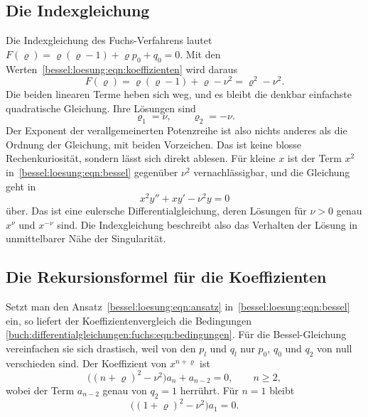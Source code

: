 %
%
\subsection{Die Indexgleichung
\label{bessel:loesung:subsection:index}}
Die Indexgleichung des Fuchs-Verfahrens lautet $F(\varrho) = \varrho(\varrho-1) + \varrho p_0 + q_0 = 0$.
%
Mit den Werten~\eqref{bessel:loesung:eqn:koeffizienten} wird daraus
\begin{equation}
F(\varrho)
=
\varrho(\varrho-1) + \varrho - \nu^2
=
\varrho^2 - \nu^2.
\label{bessel:loesung:eqn:index}
\end{equation}
Die beiden linearen Terme heben sich weg, und es bleibt die denkbar einfachste quadratische Gleichung.
Ihre Lösungen sind
\begin{equation}
\varrho_1 = \nu,
\qquad
\varrho_2 = -\nu.
\label{bessel:loesung:eqn:varrho}
\end{equation}
Der Exponent der verallgemeinerten Potenzreihe ist also nichts anderes als die Ordnung der Gleichung, mit beiden Vorzeichen.
Das ist keine blosse Rechenkuriosität, sondern lässt sich direkt ablesen.
Für kleine $x$ ist der Term $x^2$ in~\eqref{bessel:loesung:eqn:bessel}
gegenüber $\nu^2$ vernachlässigbar, und die Gleichung geht in
\[
x^2y'' + xy' - \nu^2 y = 0
\]
über.
Das ist eine eulersche Differentialgleichung, deren Lösungen für $\nu>0$ genau $x^{\nu}$ und $x^{-\nu}$ sind.
Die Indexgleichung beschreibt also das Verhalten der Lösung in unmittelbarer Nähe der Singularität.

%
%
\subsection{Die Rekursionsformel für die Koeffizienten
\label{bessel:loesung:subsection:rekursion}}
Setzt man den Ansatz~\eqref{bessel:loesung:eqn:ansatz} in~\eqref{bessel:loesung:eqn:bessel} ein, so liefert der Koeffizientenvergleich die Bedingungen \eqref{buch:differentialgleichungen:fuchs:eqn:bedingungen}.
Für die Bessel-Gleichung vereinfachen sie sich drastisch, weil von den $p_l$ und $q_l$ nur $p_0$, $q_0$ und $q_2$ von null verschieden sind.
Der Koeffizient von $x^{n+\varrho}$ ist
%
\begin{equation}
\bigl((n+\varrho)^2-\nu^2\bigr)a_n + a_{n-2} = 0,
\qquad n \ge 2,
\label{bessel:loesung:eqn:rekursion}
\end{equation}
wobei der Term $a_{n-2}$ genau von $q_2=1$ herrührt.
Für $n=1$ bleibt
\begin{equation}
\bigl((1+\varrho)^2-\nu^2\bigr)a_1 = 0.
\label{bessel:loesung:eqn:a1}
\end{equation}

